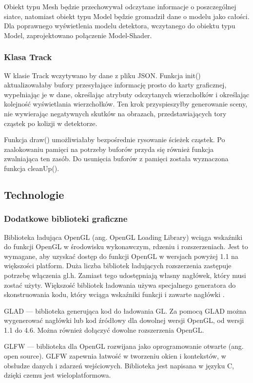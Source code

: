 Obiekt typu Mesh będzie przechowywał odczytane informacje o poszczególnej siatce, natomiast obiekt typu Model będzie gromadził dane o modelu jako całości. Dla poprawnego wyświetlenia modelu detektora, wczytanego do obiektu typu Model, zaprojektowano połączenie Model-Shader.

\subsubsection{Klasa Track}
W klasie Track wczytywano by dane z pliku JSON. Funkcja init() aktualizowałaby bufory przesyłające informację prosto do karty graficznej, wypełniając je w dane, określając atrybuty odczytanych wierzchołków i określając kolejność wyświetlania wierzchołków. Ten krok przyspieszyłby generowanie sceny, nie wywierając negatywnych skutków na obrazach, przedstawiających tory cząstek po kolizji w detektorze.

Funkcja draw() umożliwiałaby bezpośrednie rysowanie ścieżek cząstek. Po zaalokowaniu pamięci na potrzeby buforów przyda się również funkcja zwalniająca ten zasób. Do usunięcia buforów z pamięci została wyznaczona funkcja cleanUp().

\subsection{Technologie}
\subsubsection{Dodatkowe biblioteki graficzne}
Biblioteka ładująca OpenGL (ang. OpenGL Loading Library) wciąga wskaźniki do funkcji OpenGL w środowisku wykonawczym, rdzeniu i rozszerzeniach. Jest to wymagane, aby uzyskać dostęp do funkcji OpenGL w wersjach powyżej 1.1 na większości platform. Duża liczba bibliotek ładujących rozszerzenia zastępuje potrzebę włączenia gl.h. Zamiast tego udostępniają własny nagłówek, który musi zostać użyty. Większość bibliotek ładowania używa specjalnego generatora do skonstruowania kodu, który wciąga wskaźniki funkcji i zawarte nagłówki \cite{LoadingLibrary}.

GLAD --- biblioteka generująca kod do ładowania GL. Za pomocą GLAD można wygenerować nagłówki lub kod źródłowy dla dowolnej wersji OpenGL, od wersji 1.1 do 4.6. Można również dołączyć dowolne rozszerzenia OpenGL.

GLFW --- biblioteka dla OpenGL rozwijana jako oprogramowanie otwarte (ang. open source). GLFW zapewnia łatwość w tworzeniu okien i kontekstów, w obsłudze danych i zdarzeń wejściowych. Biblioteka jest napisana w języku C, dzięki czemu jest wieloplatformowa.

